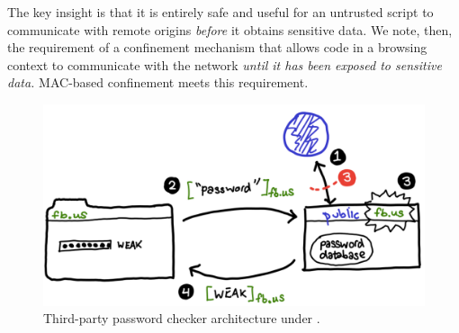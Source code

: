 The key insight is that it is entirely safe and useful for an untrusted script to
communicate with remote origins {\em before} it obtains sensitive
data. We note, then, the requirement of a confinement mechanism that
allows code in a browsing context to communicate with the network {\em
  until it has been exposed to sensitive data.} MAC-based confinement
meets this requirement.

\begin{figure}
\centerline{\includegraphics[width=\columnwidth]{checker-byhand}}
\caption{\label{fig:checker} Third-party password checker architecture
under \sys{}.}
\end{figure}

